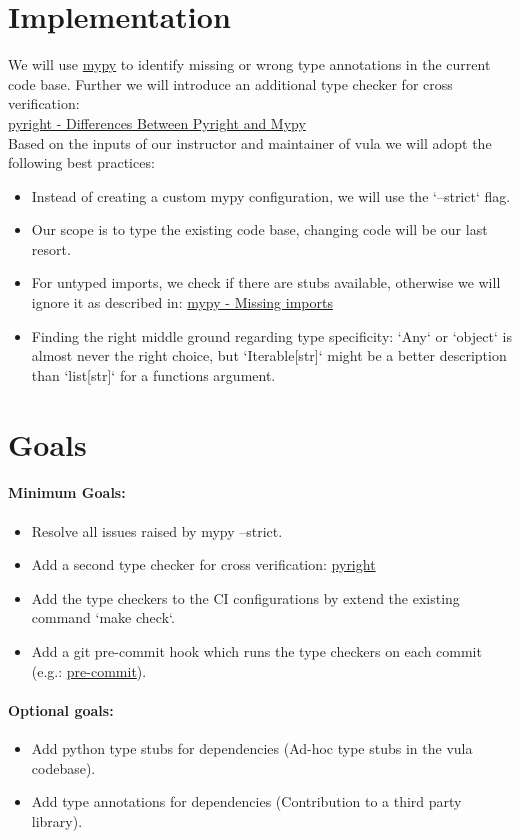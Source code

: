 \documentclass{article}
\begin{document}
    \section{Implementation}\label{sec:implementation}
    We will use \href{https://www.mypy-lang.org/}{mypy} to identify missing or wrong type annotations in the current code base.
    \hfill \break
    \hfill \break
    Further we will introduce an additional type checker for cross verification: \\
    \href{https://github.com/microsoft/pyright/blob/main/docs/mypy-comparison.md}{pyright - Differences Between Pyright and Mypy} \\
    \hfill \break
    Based on the inputs of our instructor and maintainer of vula we will adopt the following best practices:
    \begin{itemize}
        \item Instead of creating a custom mypy configuration, we will use the `--strict` flag.
        \item Our scope is to type the existing code base, changing code will be our last resort.
        \item For untyped imports, we check if there are stubs available,
        otherwise we will ignore it as described in: \href{https://mypy.readthedocs.io/en/stable/running_mypy.html#missing-imports}{mypy - Missing imports}
        \item Finding the right middle ground regarding type specificity: `Any` or `object` is almost never the right choice, but `Iterable[str]` might be a better description than `list[str]` for a functions argument.
    \end{itemize}

    \section{Goals}\label{sec:goals}
    \paragraph{\textbf{Minimum Goals:}}
    \begin{itemize}
        \item Resolve all issues raised by mypy --strict.
        \item Add a second type checker for cross verification: \href{https://github.com/microsoft/pyright/blob/main/docs/mypy-comparison.md}{pyright}
        \item Add the type checkers to the CI configurations by extend the existing command `make check`.
        \item Add a git pre-commit hook which runs the type checkers on each commit (e.g.: \href{https://pre-commit.com/}{pre-commit}).
    \end{itemize}

    \paragraph{\textbf{Optional goals:}}
    \begin{itemize}
        \item Add python type stubs for dependencies (Ad-hoc type stubs in the vula codebase).
        \item Add type annotations for dependencies (Contribution to a third party library).
    \end{itemize}
\end{document}
